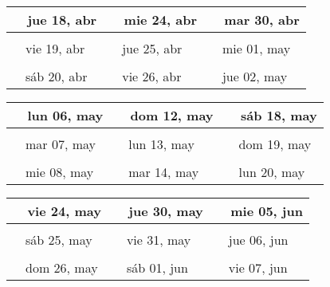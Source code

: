 \documentclass[letterpaper,10pt]{article}
\begin{document}
\begin{tabular}{lll}
\\
{\ \ jue 18, abr\hspace{4.5cm}\vspace{2.25cm}} &{\ \ mie 24, abr\hspace{4.5cm}} &{\ \ mar 30, abr\hspace{4.5cm}}
\\ \hline \\
{\ \ vie 19, abr\vspace{2.25cm}} & {\ \ jue 25, abr} & {\ \ mie 01, may}
\\ \hline \\
{\ \ sáb 20, abr\vspace{2.25cm}} & {\ \ vie 26, abr} & {\ \ jue 02, may}
\\
\end{tabular}\par
\begin{tabular}{lll}
\\
{\ \ lun 06, may\hspace{4.5cm}\vspace{2.25cm}} &{\ \ dom 12, may\hspace{4.5cm}} &{\ \ sáb 18, may\hspace{4.5cm}}
\\ \hline \\
{\ \ mar 07, may\vspace{2.25cm}} & {\ \ lun 13, may} & {\ \ dom 19, may}
\\ \hline \\
{\ \ mie 08, may\vspace{2.25cm}} & {\ \ mar 14, may} & {\ \ lun 20, may}
\\
\end{tabular}\par
\begin{tabular}{lll}
\\
{\ \ vie 24, may\hspace{4.5cm}\vspace{2.25cm}} &{\ \ jue 30, may\hspace{4.5cm}} &{\ \ mie 05, jun\hspace{4.5cm}}
\\ \hline \\
{\ \ sáb 25, may\vspace{2.25cm}} & {\ \ vie 31, may} & {\ \ jue 06, jun}
\\ \hline \\
{\ \ dom 26, may\vspace{2.25cm}} & {\ \ sáb 01, jun} & {\ \ vie 07, jun}
\\
\end{tabular}\par
\end{document}
